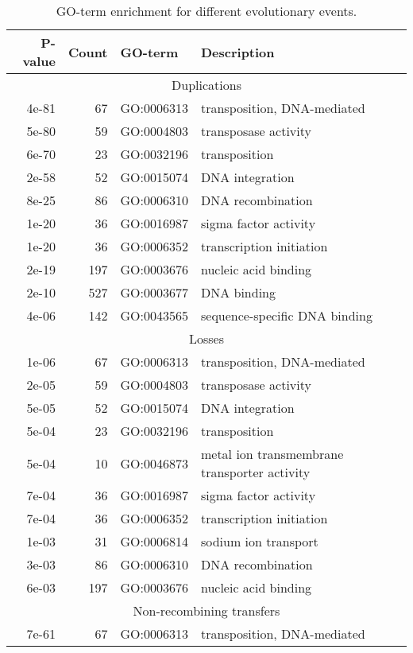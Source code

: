 \documentclass[english]{article}
\begin{document}
\clearpage{}%

\begin{table}
\caption{\label{tab:go-events}
GO-term enrichment for different evolutionary events. }

\begin{tabular}{rrll}
P-value & Count & GO-term & Description \\
\hline
\multicolumn{4}{c}{Duplications} \\
\hline
4e-81 &  67 & GO:0006313 & transposition, DNA-mediated\\
5e-80 &  59 & GO:0004803 & transposase activity\\
6e-70 &  23 & GO:0032196 & transposition\\
2e-58 &  52 & GO:0015074 & DNA integration\\
8e-25 &  86 & GO:0006310 & DNA recombination\\
1e-20 &  36 & GO:0016987 & sigma factor activity\\
1e-20 &  36 & GO:0006352 & transcription initiation\\
2e-19 & 197 & GO:0003676 & nucleic acid binding\\
2e-10 & 527 & GO:0003677 & DNA binding\\
4e-06 & 142 & GO:0043565 & sequence-specific DNA binding\\
\hline
\hline
\multicolumn{4}{c}{Losses} \\
\hline
1e-06 &  67 & GO:0006313 & transposition, DNA-mediated\\
2e-05 &  59 & GO:0004803 & transposase activity\\
5e-05 &  52 & GO:0015074 & DNA integration\\
5e-04 &  23 & GO:0032196 & transposition\\
5e-04 &  10 & GO:0046873 & metal ion transmembrane transporter activity\\
7e-04 &  36 & GO:0016987 & sigma factor activity\\
7e-04 &  36 & GO:0006352 & transcription initiation\\
1e-03 &  31 & GO:0006814 & sodium ion transport\\
3e-03 &  86 & GO:0006310 & DNA recombination\\
6e-03 & 197 & GO:0003676 & nucleic acid binding\\
\hline
\hline
\multicolumn{4}{c}{Non-recombining transfers} \\
\hline
7e-61 &  67 & GO:0006313 & transposition, DNA-mediated\\

\end{tabular}
\end{table}
\end{document}
